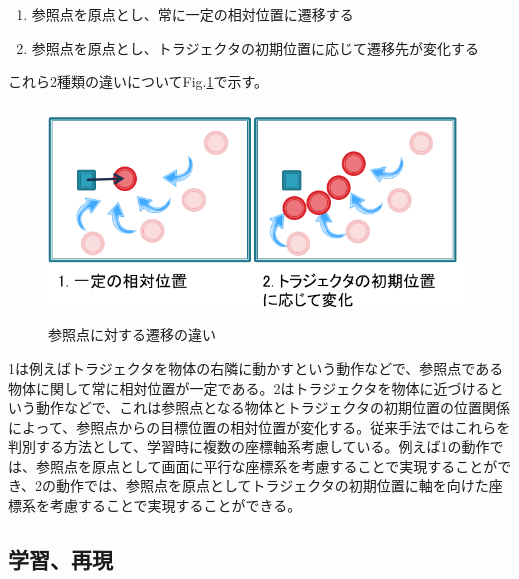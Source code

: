 	\begin{enumerate}
		\item 参照点を原点とし、常に一定の相対位置に遷移する
		\item 参照点を原点とし、トラジェクタの初期位置に応じて遷移先が変化する
	\end{enumerate}
これら2種類の違いについてFig.\ref{figure:2_difference_displacement}で示す。
	\begin{figure}[t]
		\begin{center}
			\includegraphics[width=11cm]{figure2_2.png} \\ %
			\caption{参照点に対する遷移の違い}
			\label{figure:2_difference_displacement}
		\end{center}
	\end{figure}
1は例えばトラジェクタを物体の右隣に動かすという動作などで、参照点である物体に関して常に相対位置が一定である。2はトラジェクタを物体に近づけるという動作などで、これは参照点となる物体とトラジェクタの初期位置の位置関係によって、参照点からの目標位置の相対位置が変化する。従来手法ではこれらを判別する方法として、学習時に複数の座標軸系考慮している。例えば1の動作では、参照点を原点として画面に平行な座標系を考慮することで実現することができ、2の動作では、参照点を原点としてトラジェクタの初期位置に軸を向けた座標系を考慮することで実現することができる。

\subsection{学習、再現}

